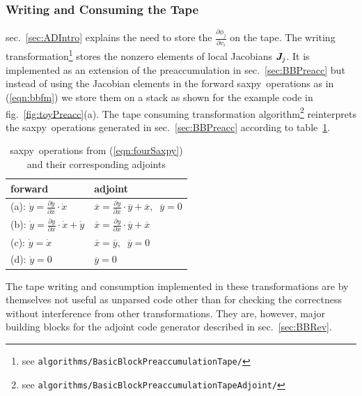 \documentclass{book}
\newcommand{\saxpy}{saxpy}
\newcommand{\bmJ}{\mbox{\bf\em J}}
\newcommand{\refsec}[1]{{sec.~\ref{#1}}}
\newcommand{\reffig}[1]{{fig.~\ref{#1}}}
\newcommand{\reftab}[1]{{table~\ref{#1}}}
\newcommand{\refeqn}[1]{{(\ref{#1})}}
\begin{document}
\subsubsection{Writing and Consuming the Tape}\label{sec:bbTA}

\refsec{sec:ADIntro} explains the need to store the $\frac{\partial \phi_j}{\partial v_i}$ 
on the tape. 
The writing transformation\footnote{
  see \lstinline{algorithms/BasicBlockPreaccumulationTape/}
}
stores the nonzero elements of local
Jacobians $\bmJ_j$. It is implemented as an extension of the 
preaccumulation in \refsec{sec:BBPreacc} but instead of using the Jacobian elements 
in the forward 
\saxpy\ operations as in \refeqn{eqn:bbfm} we store them 
on a stack as shown for the example code in \reffig{fig:toyPreacc}(a). 
The tape consuming transformation algorithm\footnote{ 
  see \lstinline{algorithms/BasicBlockPreaccumulationTapeAdjoint/}
} 
reinterprets
the \saxpy\ operations generated in \refsec{sec:BBPreacc} 
according to \reftab{tab:saxpyAdj}.
\begin{table}
  \begin{center}
    \begin{tabular}{l|l}
      forward & adjoint\\\hline
      (a): $\dot{y} = \frac{\partial y }{\partial x }\cdot \dot{x}$           & $\overline{x} = \frac{\partial y }{\partial x }\cdot \overline{y} + \overline{x},\;\;\overline{y}=0$ \\
      (b): $\dot{y} = \frac{\partial y }{\partial x }\cdot \dot{x} + \dot{y}$ & $\overline{x} = \frac{\partial y }{\partial x }\cdot \overline{y} + \overline{x}$ \\
      (c): $\dot{y} = \dot{x}$ 					            & $\overline{x} = \overline{y},\;\;\overline{y}=0$\\
      (d): $\dot{y} = 0$ 						            & $\overline{y} = 0$ 
    \end{tabular}
  \end{center}
  \caption{\saxpy\ operations  from \refeqn{eqn:fourSaxpy} and their corresponding adjoints} \label{tab:saxpyAdj}
\end{table} 
The tape writing and consumption implemented in these transformations are 
by themselves not useful as unparsed code other than for checking the correctness without 
interference from other transformations. 
They are, however, major building blocks for the  
adjoint code generator described in \refsec{sec:BBRev}.
\end{document}
